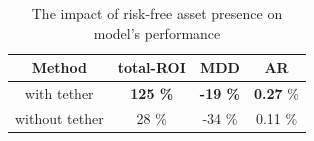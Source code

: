 \begin{table}[h]
	\centering
	\caption{The impact of risk-free asset presence on model's performance}
	\label{tbl:rf1}
	\begin{tabular}{c | c | c | c  }
		Method & total-ROI & MDD & AR \\
		\hline
		\hline
		with tether & \textbf{125 \%}  & \textbf{-19 \%} & \textbf{0.27}  \% \\
		without tether & 28 \% & -34 \% & 0.11 \% \\
	\end{tabular}
\end{table}

%


